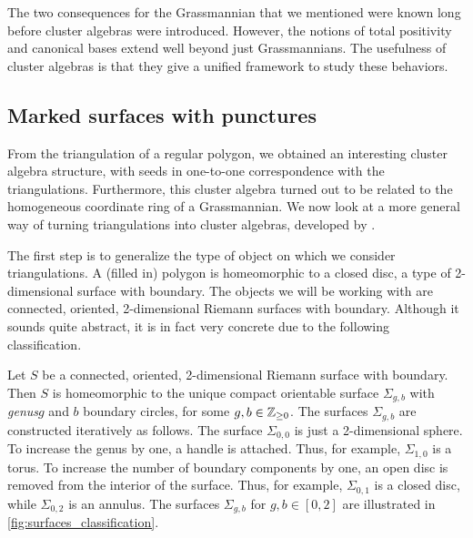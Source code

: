 The two consequences for the Grassmannian that we mentioned were known long before
cluster algebras were introduced. However, the notions of total positivity and
canonical bases extend well beyond just Grassmannians. The usefulness of cluster
algebras is that they give a unified framework to study these behaviors.

\subsection{Marked surfaces with punctures}\label{sec:triangulations_of_surfaces}

From the triangulation of a regular polygon, we obtained an interesting cluster algebra
structure, with seeds in one-to-one correspondence with the triangulations.
Furthermore, this cluster algebra turned out to be related to the homogeneous
coordinate ring of a Grassmannian. We now look at a more general way of turning
triangulations into cluster algebras, developed by
\textcite[postnote]{FominShapiroThurston2008CATriangulatedSurfacesI}.

\medskip
The first step is to generalize the type of object on which we consider triangulations. A (filled in) polygon is homeomorphic to a closed disc, a type of 2-dimensional surface with boundary. The objects we will be working with are connected, oriented, 2-dimensional Riemann surfaces with boundary. Although it sounds quite abstract, it is in fact very concrete due to the following classification.
\begin{theorem}\label{thm:classification_surfaces}

	Let $S$ be a connected, oriented, 2-dimensional Riemann surface with boundary. Then $S$
	is homeomorphic to the unique compact orientable surface $\Sigma_{g,b}$ with \emph{genus}$g$ and $b$ boundary circles,
	for some $g, b \in \mathbb{Z}_{\geq 0}$. The surfaces $\Sigma_{g,b}$ are constructed
	iteratively as follows. The surface $\Sigma_{0,0}$ is just a 2-dimensional sphere. To
	increase the genus by one, a handle is attached. Thus, for example, $\Sigma_{1,0}$ is a
	torus. To increase the number of boundary components by one, an open disc is removed
	from the interior of the surface. Thus, for example, $\Sigma_{0,1}$ is a closed disc,
	while $\Sigma_{0,2}$ is an annulus. The surfaces $\Sigma_{g,b}$ for $g,b \in [0,2]$ are
	illustrated in \cref{fig:surfaces_classification}.
\end{theorem}

